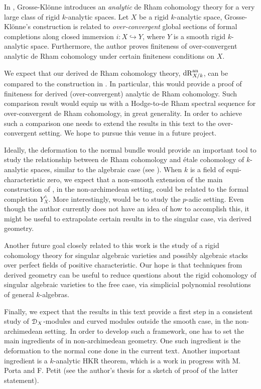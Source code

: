 \documentclass[10pt,a4paper,reqno]{amsart} %
\theoremstyle{plain}
\theoremstyle{definition}
\theoremstyle{remark}
\numberwithin{equation}{section}
\begin{document}
In \cite{grosse2002finiteness}, Grosse-Kl\"onne introduces an \emph{analytic} de Rham cohomology
theory for a very large class of rigid $k$-analytic spaces. Let $X$ be a rigid $k$-analytic space,
Grosse-Kl\"onne's construction is related to \emph{over-convergent} global sections of formal completions
along closed immersion $i \colon X \hookrightarrow Y$, where $Y$ is a smooth rigid $k$-analytic space.
Furthermore, the author proves finiteness of over-convergent analytic de Rham cohomology under certain finiteness conditions on $X$.

We expect that our derived de Rham cohomology theory, $\mathrm{dR}_{X/k}^\mathrm{an}$, can be compared to the construction in \cite{grosse2002finiteness}. In particular,
this would provide a proof of finiteness for derived (over-convergent) analytic de Rham cohomology.
Such comparison result would equip us with a Hodge-to-de Rham
spectral sequence for over-convergent de Rham cohomology, in great generality. 
In order to achieve such a comparison one needs to extend
the results in this text to the over-convergent setting. We hope to pursue this venue in a future project.


Ideally, the deformation to the normal bundle would provide an important tool to study the relationship between de Rham cohomology and \'etale cohomology
of $k$-analytic spaces, similar to the algebraic case (see \cite[\S 1, Corollary]{Bhatt_Derived_Completions}). When $k$ is a field of equi-characteristic zero, we expect that a non-smooth extension of the main construction of \cite{achinger2019betti}, in the non-archimedean setting, could be related to the formal
completion $Y^\wedge_X$. More interestingly, would be to study the $p$-adic setting. Even though the author currently does not have an idea of how to accomplish
this, it might be useful to extrapolate certain results in \cite{bras2018overconvergent} to the singular case, via derived geometry.

Another future goal closely related to this work is the study of a rigid cohomology theory for singular algebraic varieties and possibly algebraic stacks over perfect fields of
positive characteristic. Our hope is that techniques from derived geometry can be useful to reduce questions about the rigid cohomology of singular algebraic varieties to the free case, via simplicial polynomial resolutions
of general $k$-algebras.

Finally, we expect that the results in this text provide a first step in a consistent study of $\mathcal D_X$-modules and curved modules outside the smooth case, in the non-archimedean setting.
In order to develop such a framework, one has to set the main ingredients of \cite{ben2012loop} in non-archimedean geometry. One such ingredient is the deformation to the normal cone done
in the current text. Another important ingredient is a $k$-analytic HKR theorem, which is a work in progress with M. Porta and F. Petit (see the author's thesis \cite{ferreira2019modeles}
for a sketch of proof of the latter statement).
\end{document}
